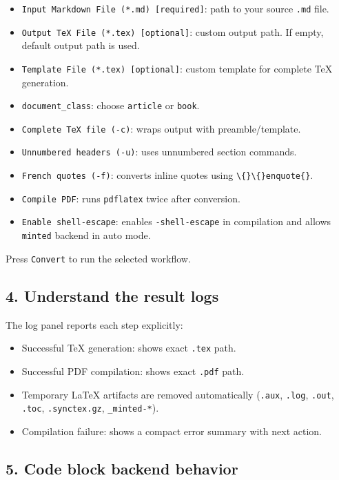 \documentclass[a4paper, 12pt, twoside]{article}
\begin{document}
\begin{itemize}
    \item \texttt{Input Markdown File (*.md) [required]}: path to your source \texttt{.md} file.
    \item \texttt{Output TeX File (*.tex) [optional]}: custom output path. If empty, default output path is used.
    \item \texttt{Template File (*.tex) [optional]}: custom template for complete TeX generation.
    \item \texttt{document\_class}: choose \texttt{article} or \texttt{book}.
    \item \texttt{Complete TeX file (-c)}: wraps output with preamble/template.
    \item \texttt{Unnumbered headers (-u)}: uses unnumbered section commands.
    \item \texttt{French quotes (-f)}: converts inline quotes using \texttt{\textbackslash\{\}\textbackslash\{\}enquote\{\}}.
    \item \texttt{Compile PDF}: runs \texttt{pdflatex} twice after conversion.
    \item \texttt{Enable shell-escape}: enables \texttt{-shell-escape} in compilation and allows \texttt{minted} backend in auto mode.
\end{itemize}

Press \texttt{Convert} to run the selected workflow.

\subsection*{4. Understand the result logs}

The log panel reports each step explicitly:

\begin{itemize}
    \item Successful TeX generation: shows exact \texttt{.tex} path.
    \item Successful PDF compilation: shows exact \texttt{.pdf} path.
    \item Temporary LaTeX artifacts are removed automatically (\texttt{.aux}, \texttt{.log}, \texttt{.out}, \texttt{.toc}, \texttt{.synctex.gz}, \texttt{\_minted-*}).
    \item Compilation failure: shows a compact error summary with next action.
\end{itemize}

\subsection*{5. Code block backend behavior}
\end{document}
